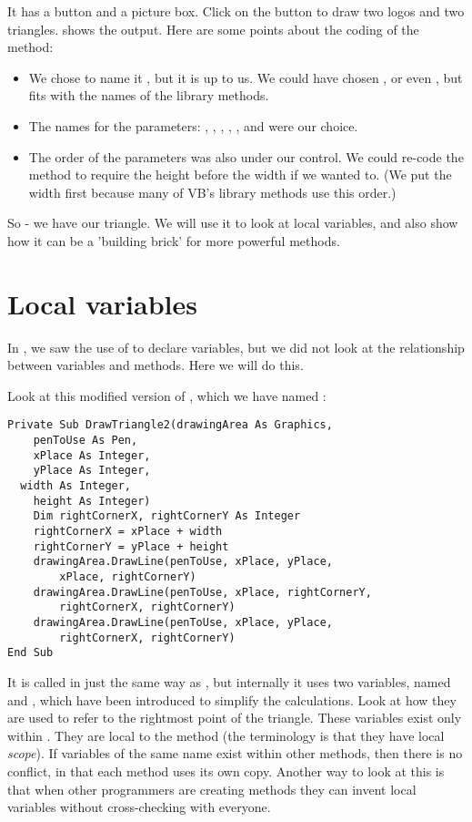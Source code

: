 		It has a button and a picture box. Click on the button to draw two logos and two triangles.  shows the output.
		Here are some points about the coding of the  method:
		\begin{itemize}
			\item We chose to name it , but it is up to us. We could have chosen , or even , but  fits with the names of the library methods.
			\item The names for the parameters: , , , , , and  were our choice.
			\item The order of the parameters was also under our control. We could re-code the method to require the height before the width if we wanted to. (We put the width first because many of VB's library methods use this order.)
		\end{itemize}
		So - we have our triangle. We will use it to look at local variables, and also show how it can be a 'building brick' for more powerful methods.

	\section{Local variables}
	In , we saw the use of  to declare variables, but we did not look at the relationship between variables and methods. Here we will do this.
		
		Look at this modified version of , which we have named :
		\begin{lstlisting}
Private Sub DrawTriangle2(drawingArea As Graphics,
	penToUse As Pen,
	xPlace As Integer,
	yPlace As Integer,
  width As Integer,
	height As Integer)
	Dim rightCornerX, rightCornerY As Integer
	rightCornerX = xPlace + width
	rightCornerY = yPlace + height
	drawingArea.DrawLine(penToUse, xPlace, yPlace,
		xPlace, rightCornerY)
	drawingArea.DrawLine(penToUse, xPlace, rightCornerY,
		rightCornerX, rightCornerY)
	drawingArea.DrawLine(penToUse, xPlace, yPlace,
		rightCornerX, rightCornerY)
End Sub
		\end{lstlisting}
		It is called in just the same way as , but internally it uses two variables, named  and , which have been introduced to simplify the calculations. Look at how they are used to refer to the rightmost point of the triangle. These variables exist only within . They are local to the method (the terminology is that they have local \emph{scope}). If variables of the same name exist within other methods, then there is no conflict, in that each method uses its own copy. Another way to look at this is that when other programmers are creating methods they can invent local variables without cross-checking with everyone.

